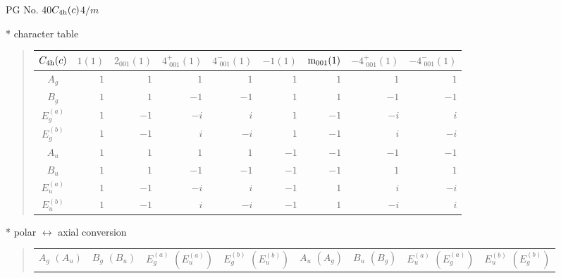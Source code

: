 \documentclass[fleqn,8pt,landscape]{jsarticle}
\begin{document}
\setcounter{MaxMatrixCols}{32}

\renewcommand{\tablename}{Table~}
\renewcommand{\figurename}{Figure~}
\begin{center}
\LARGE
PG No. 40\quad$C_{\rm 4h}(c)$\quad$4/m$\quad[ tetragonal ]
\end{center}

* character table
\begin{quote}
\begin{tabular}{crrrrrrrr} \hline \hline
$ C_{\rm 4h}(c) $ & $ 1(1) $ & $ 2{}_{001}(1) $ & $ 4^{+}_{\,\,001}(1) $ & $ 4^{-}_{\,\,001}(1) $ & $ -1(1) $ & $ {\rm m}_{001}(1) $ & $ -4^{+}_{\,\,001}(1) $ & $ -4^{-}_{\,\,001}(1) $ \\ \hline
$ A_{g} $ & $ 1 $ & $ 1 $ & $ 1 $ & $ 1 $ & $ 1 $ & $ 1 $ & $ 1 $ & $ 1 $ \\
$ B_{g} $ & $ 1 $ & $ 1 $ & $ -1 $ & $ -1 $ & $ 1 $ & $ 1 $ & $ -1 $ & $ -1 $ \\
$ E_{g}^{(a)} $ & $ 1 $ & $ -1 $ & $ - i $ & $ i $ & $ 1 $ & $ -1 $ & $ - i $ & $ i $ \\
$ E_{g}^{(b)} $ & $ 1 $ & $ -1 $ & $ i $ & $ - i $ & $ 1 $ & $ -1 $ & $ i $ & $ - i $ \\
$ A_{u} $ & $ 1 $ & $ 1 $ & $ 1 $ & $ 1 $ & $ -1 $ & $ -1 $ & $ -1 $ & $ -1 $ \\
$ B_{u} $ & $ 1 $ & $ 1 $ & $ -1 $ & $ -1 $ & $ -1 $ & $ -1 $ & $ 1 $ & $ 1 $ \\
$ E_{u}^{(a)} $ & $ 1 $ & $ -1 $ & $ - i $ & $ i $ & $ -1 $ & $ 1 $ & $ i $ & $ - i $ \\
$ E_{u}^{(b)} $ & $ 1 $ & $ -1 $ & $ i $ & $ - i $ & $ -1 $ & $ 1 $ & $ - i $ & $ i $ \\
 \hline \hline
\end{tabular}
\end{quote}

* polar $\leftrightarrow$ axial conversion
\begin{quote}
\begin{tabular}{cccccccc}
$ A_{g}\,\,(A_{u}) $ & $ B_{g}\,\,(B_{u}) $ & $ E_{g}^{(a)}\,\,(E_{u}^{(a)}) $ & $ E_{g}^{(b)}\,\,(E_{u}^{(b)}) $ & $ A_{u}\,\,(A_{g}) $ & $ B_{u}\,\,(B_{g}) $ & $ E_{u}^{(a)}\,\,(E_{g}^{(a)}) $ & $ E_{u}^{(b)}\,\,(E_{g}^{(b)}) $
\end{tabular}
\end{quote}
\end{document}
